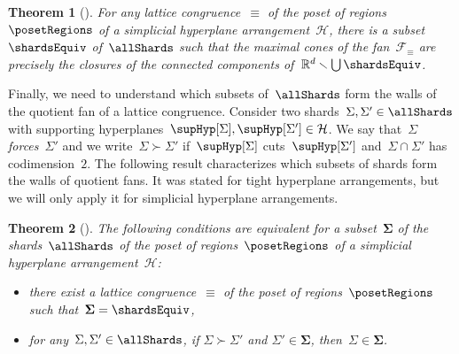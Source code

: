 \documentclass{amsart}
\newtheorem{theorem}{Theorem}%
\theoremstyle{definition}
\newcommand{\R}{\mathbb{R}} %
\newcommand{\ssm}{\smallsetminus} %
\newcommand{\darkblue}{\color{darkblue}} %
\newcommand{\defn}[1]{\textsl{\darkblue #1}} %
\newcommand{\arrangement}{\mathcal{H}} %
\newcommand{\shard}{\Sigma}
\newcommand{\shards}{\boldsymbol{\Sigma}}
\newcommand{\fanEquiv}{\mathcal{F}_\equiv} %
\begin{document}
\begin{theorem}[{\cite[Sect.~8.1]{Reading-PosetRegionsChapter}}]
\label{thm:shardsWalls}
For any lattice congruence~$\equiv$ of the poset of regions~$\posetRegions$ of a simplicial hyperplane arrangement~$\arrangement$, there is a subset~$\shardsEquiv$ of~$\allShards$ such that the maximal cones of the fan~$\fanEquiv$ are precisely the closures of the connected components of~$\R^d \ssm \bigcup \shardsEquiv$.
\end{theorem}

Finally, we need to understand which subsets of~$\allShards$ form the walls of the quotient fan of a lattice congruence.
Consider two shards~$\shard, \shard' \in \allShards$ with supporting hyperplanes~${\supHyp[\shard], \supHyp[\shard'] \in \arrangement}$.
We say that~$\shard$ \defn{forces}~$\shard'$ and we write~$\shard \succ \shard'$ if~$\supHyp[\shard]$ cuts~$\supHyp[\shard']$ and~$\shard \cap \shard'$ has codimension~$2$.
The following result characterizes which subsets of shards form the walls of quotient fans.
It was stated for tight hyperplane arrangements, but we will only apply it for simplicial hyperplane arrangements.

\begin{theorem}[{\cite[Sect.~8.1]{Reading-PosetRegionsChapter}}]
\label{thm:shardsForcing}
The following conditions are equivalent for a subset~$\shards$ of the shards~$\allShards$ of the poset of regions~$\posetRegions$ of a simplicial hyperplane arrangement~$\arrangement$:
\begin{itemize}
\item there exist a lattice congruence~$\equiv$ of the poset of regions~$\posetRegions$ such that~$\shards = \shardsEquiv$,
\item for any~$\shard, \shard' \in \allShards$, if $\shard \succ \shard'$ and $\shard' \in \shards$, then~$\shard \in \shards$.
\end{itemize}
\end{theorem}
\end{document}
